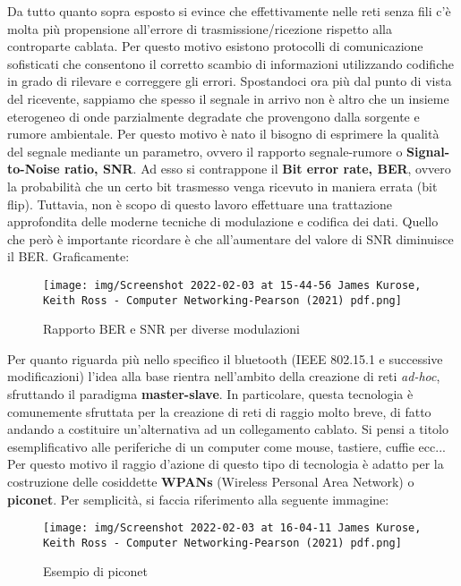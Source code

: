\documentclass[12pt,twoside]{report}
\begin{document}
    Da tutto quanto sopra esposto si evince che effettivamente nelle reti senza fili c'è molta più propensione all'errore di trasmissione/ricezione rispetto alla controparte cablata. Per questo motivo esistono protocolli di comunicazione sofisticati che consentono il corretto scambio di informazioni utilizzando codifiche in grado di rilevare e correggere gli errori.
    Spostandoci ora più dal punto di vista del ricevente, sappiamo che spesso il segnale in arrivo non è altro che un insieme eterogeneo di onde parzialmente degradate che provengono dalla sorgente e rumore ambientale. Per questo motivo è nato il bisogno di esprimere la qualità del segnale mediante un parametro, ovvero il rapporto segnale-rumore o \textbf{Signal-to-Noise ratio, SNR}. Ad esso si contrappone il \textbf{Bit error rate, BER}, ovvero la probabilità che un certo bit trasmesso venga ricevuto in maniera errata (bit flip). Tuttavia, non è scopo di questo lavoro effettuare una trattazione approfondita delle moderne tecniche di modulazione e codifica dei dati. Quello che però è importante ricordare è che all'aumentare del valore di SNR diminuisce il BER. Graficamente:
    
    \begin{figure}[htb]
    	\hfill\texttt{[image: img/Screenshot 2022-02-03 at 15-44-56 James Kurose, Keith Ross - Computer Networking-Pearson (2021) pdf.png]}\hfill
    	\label{fig:Adj1}
    	\caption{Rapporto BER e SNR per diverse modulazioni}
    \end{figure}
    \FloatBarrier
    
    Per quanto riguarda più nello specifico il bluetooth (IEEE 802.15.1 e successive modificazioni) l'idea alla base rientra nell'ambito della creazione di reti \textit{ad-hoc}, sfruttando il paradigma \textbf{master-slave}. In particolare, questa tecnologia è comunemente sfruttata per la creazione di reti di raggio molto breve, di fatto andando a costituire un'alternativa ad un collegamento cablato. Si pensi a titolo esemplificativo alle periferiche di un computer come mouse, tastiere, cuffie ecc... Per questo motivo il raggio d'azione di questo tipo di tecnologia è adatto per la costruzione delle cosiddette \textbf{WPANs} (Wireless Personal Area Network) o \textbf{piconet}. Per semplicità, si faccia riferimento alla seguente immagine:
    
    \begin{figure}[h]
    	\hfill\texttt{[image: img/Screenshot 2022-02-03 at 16-04-11 James Kurose, Keith Ross - Computer Networking-Pearson (2021) pdf.png]}\hfill
    	\label{fig:Adj1}
    	\caption{Esempio di piconet}
    \end{figure}
    \FloatBarrier
    
\end{document}
